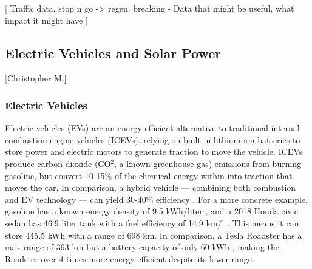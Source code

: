 \documentclass{article}                         %
\begin{document}
[ Traffic data, stop n go -> regen. breaking - Data that might be useful, what impact it might have ]




\subsection{Electric Vehicles and Solar Power}[Christopher M.]
\subsubsection{Electric Vehicles}
Electric vehicles (EVs) are an energy efficient alternative to traditional internal combustion engine vehicles (ICEVs), relying on built in lithium-ion batteries to store power and electric motors to generate traction to move the vehicle. ICEVs produce carbon dioxide (CO$^2$, a known greenhouse gas) emissions from burning gasoline, but convert 10-15\% of the chemical energy within into traction that moves the car. In comparison, a hybrid vehicle --- combining both combustion and EV technology --- can yield 30-40\% efficiency \cite{Zhu2015DistributedGrid}. For a more concrete example, gasoline has a known energy density of 9.5 kWh/liter \cite{EngineeringFactors}, and a 2018 Honda civic sedan has 46.9 liter tank with a fuel efficiency of 14.9 km/l \cite{20182018Information}. This means it can store 445.5 kWh with a range of 698 km. In comparison, a Tesla Roadster has a max range of 393 km but a battery capacity of only 60 kWh \cite{Friel2010ManagementVehicles}, making the Roadster over 4 times more energy efficient despite its lower range.
\end{document}
